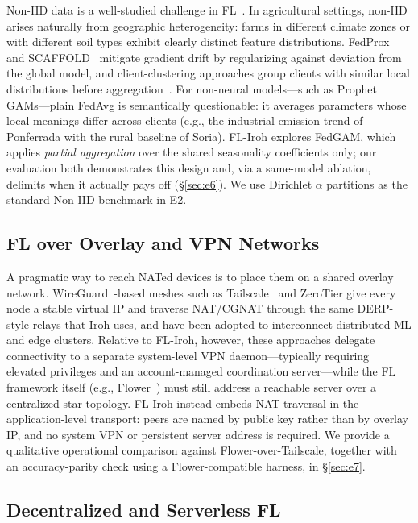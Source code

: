 \documentclass[a4paper,fleqn]{cas-dc}
\begin{document}
Non-IID data is a well-studied challenge in FL~\cite{zhao2018noniid,li2022noniid,kairouz2021}. In agricultural settings, non-IID arises naturally from geographic heterogeneity: farms in different climate zones or with different soil types exhibit clearly distinct feature distributions. FedProx~\cite{fedprox2020} and SCAFFOLD~\cite{scaffold2020} mitigate gradient drift by regularizing against deviation from the global model, and client-clustering approaches group clients with similar local distributions before aggregation~\cite{briggs2020cluster}. For non-neural models---such as Prophet GAMs---plain FedAvg is semantically questionable: it averages parameters whose local meanings differ across clients (e.g., the industrial emission trend of Ponferrada with the rural baseline of Soria). FL-Iroh explores FedGAM, which applies \emph{partial aggregation} over the shared seasonality coefficients only; our evaluation both demonstrates this design and, via a same-model ablation, delimits when it actually pays off (\S\ref{sec:e6}). We use Dirichlet $\alpha$ partitions as the standard Non-IID benchmark in E2.

\subsection{FL over Overlay and VPN Networks}

A pragmatic way to reach NATed devices is to place them on a shared overlay network. WireGuard~\cite{wireguard2017}-based meshes such as Tailscale~\cite{tailscale2023} and ZeroTier give every node a stable virtual IP and traverse NAT/CGNAT through the same DERP-style relays that Iroh uses, and have been adopted to interconnect distributed-ML and edge clusters. Relative to FL-Iroh, however, these approaches delegate connectivity to a separate system-level VPN daemon---typically requiring elevated privileges and an account-managed coordination server---while the FL framework itself (e.g., Flower~\cite{flower2022}) must still address a reachable server over a centralized star topology. FL-Iroh instead embeds NAT traversal in the application-level transport: peers are named by public key rather than by overlay IP, and no system VPN or persistent server address is required. We provide a qualitative operational comparison against Flower-over-Tailscale, together with an accuracy-parity check using a Flower-compatible harness, in \S\ref{sec:e7}.

\subsection{Decentralized and Serverless FL}
\end{document}
